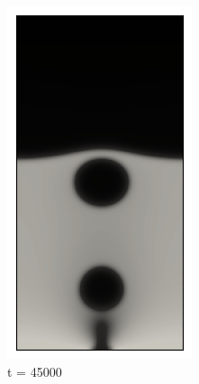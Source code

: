 \begin{figure}[h!]
\begin{subfigure}{0.25\textwidth}
		\includegraphics[width=\linewidth]{figs/cap4/bubble_45}
		\caption{t = 45000}
		\label{fig:8}
	\end{subfigure}\hfil 
	\begin{subfigure}{0.25\textwidth}

\end{subfigure}
\end{figure}
